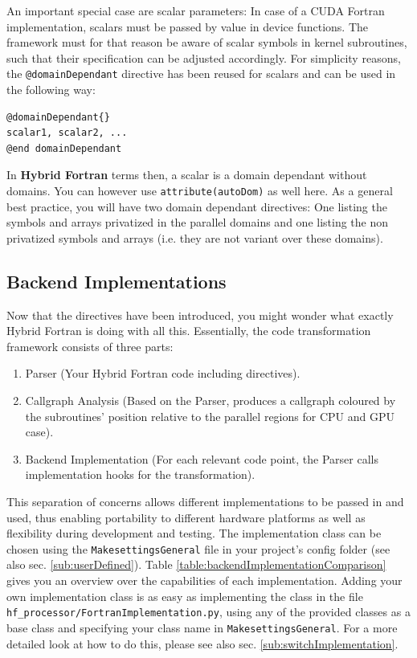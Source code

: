 An important special case are scalar parameters: In case of a CUDA Fortran implementation, scalars must be passed by value in device functions. The framework must for that reason be aware of scalar symbols in kernel subroutines, such that their specification can be adjusted accordingly. For simplicity reasons, the \verb|@domainDependant| directive has been reused for scalars and can be used in the following way:

\begin{lstlisting}[name=domainDependantScalar, label=listing:domainDependantScalar, caption={Domain dependant directive syntax for scalars.}]
@domainDependant{}
scalar1, scalar2, ...
@end domainDependant
\end{lstlisting}

In \textbf{Hybrid Fortran} terms then, a scalar is a domain dependant without domains. You can however use \verb|attribute(autoDom)| as well here. As a general best practice, you will have two domain dependant directives: One listing the symbols and arrays privatized in the parallel domains and one listing the non privatized symbols and arrays (i.e. they are not variant over these domains).

\subsection{Backend Implementations} \label{sub:backendImplementation}

 Now that the directives have been introduced, you might wonder what exactly Hybrid Fortran is doing with all this. Essentially, the code transformation framework consists of three parts:

 \begin{enumerate}
  \item Parser (Your Hybrid Fortran code including directives).
  \item Callgraph Analysis (Based on the Parser, produces a callgraph coloured by the subroutines' position relative to the parallel regions for CPU and GPU case).
  \item Backend Implementation (For each relevant code point, the Parser calls implementation hooks for the transformation).
 \end{enumerate}

 This separation of concerns allows different implementations to be passed in and used, thus enabling portability to different hardware platforms as well as flexibility during development and testing. The implementation class can be chosen using the \verb|MakesettingsGeneral| file in your project's config folder (see also sec. \ref{sub:userDefined}). Table \ref{table:backendImplementationComparison} gives you an overview over the capabilities of each implementation. Adding your own implementation class is as easy as implementing the class in the file \verb|hf_processor/FortranImplementation.py|, using any of the provided classes as a base class and specifying your class name in \verb|MakesettingsGeneral|. For a more detailed look at how to do this, please see also sec. \ref{sub:switchImplementation}.

